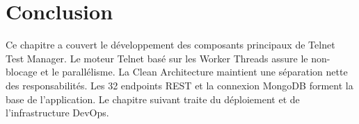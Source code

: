 \section*{Conclusion}

Ce chapitre a couvert le développement des composants principaux de
Telnet Test Manager. Le moteur Telnet basé sur les Worker Threads assure
le non-blocage et le parallélisme. La Clean Architecture maintient une
séparation nette des responsabilités. Les 32 endpoints REST et la
connexion MongoDB forment la base de l'application. Le chapitre suivant
traite du déploiement et de l'infrastructure DevOps.
